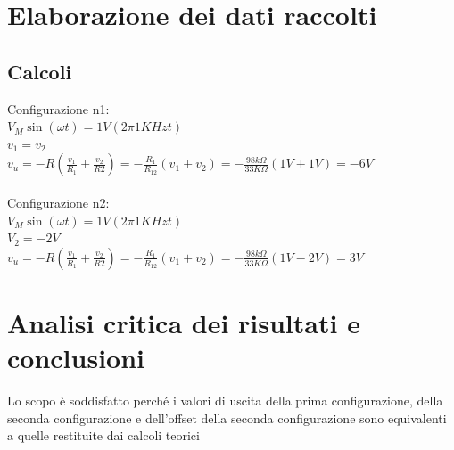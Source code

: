 \documentclass[12pt]{article}
\begin{document}
\section{Elaborazione dei dati raccolti}
\subsection{Calcoli}
Configurazione n1:\\
$V_M\sin (\omega t)=1V(2\pi1KHzt)$\\
$v_1=v_2$\\
$v_u=-R(\frac{v_1}{R_1}+\frac{v_2}{R2})=-\frac{R_1}{R_{12}}(v_1+v_2)=-\frac{98k\Omega}{33K\Omega}(1V+1V)=-6V$\\
\\
Configurazione n2:\\
$V_M\sin (\omega t)=1V(2\pi1KHzt)$\\
$V_2=-2V$\\
$v_u=-R(\frac{v_1}{R_1}+\frac{v_2}{R2})=-\frac{R_1}{R_{12}}(v_1+v_2)=-\frac{98k\Omega}{33K\Omega}(1V-2V)=3V$
\section{Analisi critica dei risultati e conclusioni}
Lo scopo è soddisfatto perché i valori di uscita della prima configurazione, della seconda configurazione e dell'offset
della seconda configurazione sono equivalenti a quelle restituite dai calcoli teorici
\end{document}
